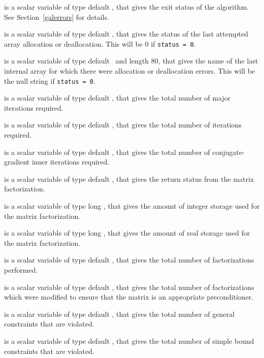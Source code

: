 \begin{description}

 is a scalar variable of type default \integer, that gives the
exit status of the algorithm.
See Section~\ref{galerrors}
for details.

 is a scalar variable of type default \integer, that gives
the status of the last attempted array allocation or deallocation.
This will be 0 if {\tt status = 0}.

 is a scalar variable of type default \character\
and length 80, that  gives the name of the last internal array
for which there were allocation or deallocation errors.
This will be the null string if {\tt status = 0}.

 is a scalar variable of type default \integer, that gives the
total number of major iterations required.

 is a scalar variable of type default \integer, that gives the
total number of iterations required.

 is a scalar variable of type default \integer, that gives the
total number of conjugate-gradient inner iterations required.

 is a scalar variable of type default \integer, that
gives the return status from the matrix factorization.

 is a scalar variable of type long
\integer, that gives the amount of integer storage used for the matrix
factorization.

 is a scalar variable of type long \integer,
that gives the amount of real storage used for the matrix factorization.

 is a scalar variable of type default \integer, that gives the
total number of factorizations performed.

 is a scalar variable of type default \integer, that gives the
total number of factorizations which were modified to
ensure that the matrix is an appropriate preconditioner.

 is a scalar variable of type default \integer, that
gives the total number of general constraints that are violated.

 is a scalar variable of type default \integer, that
gives the total number of simple bound constraints that are violated.


\end{description}

